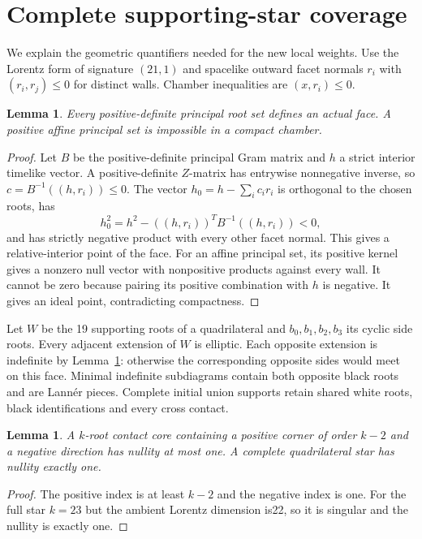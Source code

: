 \documentclass[11pt]{article}
\newtheorem{lemma}[theorem]{Lemma}
\begin{document}
\section{Complete supporting-star coverage}
We explain the geometric quantifiers needed for the new local weights.
Use the Lorentz form of signature $(21,1)$ and spacelike outward facet
normals $r_i$ with $(r_i,r_j)\le0$ for distinct walls. Chamber inequalities
are $(x,r_i)\le0$.
\begin{lemma}\label{lem:projection}
Every positive-definite principal root set defines an actual face. A
positive affine principal set is impossible in a compact chamber.
\end{lemma}
\begin{proof}
Let $B$ be the positive-definite principal Gram matrix and $h$ a strict
interior timelike vector. A positive-definite $Z$-matrix has entrywise
nonnegative inverse, so $c=B^{-1}((h,r_i))\le0$. The vector
$h_0=h-\sum_i c_i r_i$ is orthogonal to the chosen roots, has
\[
 h_0^2=h^2-((h,r_i))^TB^{-1}((h,r_i))<0,
\]
and has strictly negative product with every other facet normal. This
gives a relative-interior point of the face. For an affine principal set,
its positive kernel gives a nonzero null vector with nonpositive products
against every wall. It cannot be zero because pairing its positive
combination with $h$ is negative. It gives an ideal point, contradicting
compactness.
\end{proof}

Let $W$ be the 19 supporting roots of a quadrilateral and $b_0,b_1,b_2,b_3$
its cyclic side roots. Every adjacent extension of $W$ is elliptic.
Each opposite extension is indefinite by Lemma~\ref{lem:projection}:
otherwise the corresponding opposite sides would meet on this face.
Minimal indefinite subdiagrams contain both opposite black roots and
are Lann\'er pieces. Complete initial union supports retain shared white
roots, black identifications and every cross contact.

\begin{lemma}\label{lem:corank}
A $k$-root contact core containing a positive corner of order $k-2$ and a
negative direction has nullity at most one. A complete quadrilateral
star has nullity exactly one.
\end{lemma}
\begin{proof}
The positive index is at least $k-2$ and the negative index is one.
For the full star $k=23$ but the ambient Lorentz dimension is22, so it
is singular and the nullity is exactly one.
\end{proof}
\end{document}
